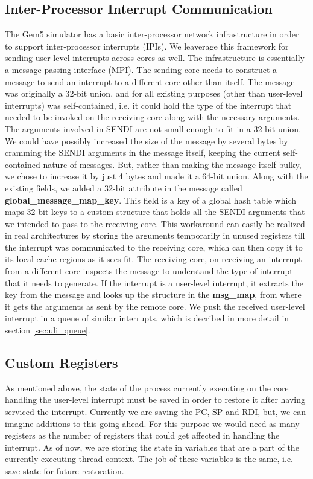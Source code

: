 \subsection{Inter-Processor Interrupt Communication}\label{sec:network}
The Gem5 simulator has a basic inter-processor network infrastructure in order
to support inter-processor interrupts (IPIs). We leaverage this framework for
sending user-level interrupts across cores as well. The infrastructure is
essentially a message-passing interface (MPI). The sending core needs to
construct a message to send an interrupt to a different core other than itself.
The message was originally a 32-bit union, and for all existing purposes (other
than user-level interrupts) was self-contained, i.e. it could hold the type of
the interrupt that needed to be invoked on the receiving core along with the
necessary arguments. The arguments involved in SENDI are not small enough to fit
in a 32-bit union. We could have possibly increased the size of the message by
several bytes by cramming the SENDI arguments in the message itself, keeping the
current self-contained nature of messages. But, rather than making the message
itself bulky, we chose to increase it by just 4 bytes and made it a 64-bit
union. Along with the existing fields, we added a 32-bit attribute in the
message called \textbf{global\_message\_map\_key}. This field is a key of a
global hash table which maps 32-bit keys to a custom structure that holds all
the SENDI arguments that we intended to pass to the receiving core. This
workaround can easily be realized in real architectures by storing the arguments
temporarily in unused registers till the interrupt was communicated to the
receiving core, which can then copy it to its local cache regions as it sees
fit. The receiving core, on receiving an interrupt from a different core
inspects the message to understand the type of interrupt that it needs to
generate. If the interrupt is a user-level interrupt, it extracts the key from
the message and looks up the structure in the \textbf{msg\_map}, from where it
gets the arguments as sent by the remote core. We push the received user-level
interrupt in a queue of similar interrupts, which is decribed in more detail in
section \ref{sec:uli_queue}.

\subsection{Custom Registers}\label{sec:regs}
As mentioned above, the state of the process currently executing on the core
handling the user-level interrupt must be saved in order to restore it after
having serviced the interrupt. Currently we are saving the PC, SP and RDI, but,
we can imagine additions to this going ahead. For this purpose we would need as
many registers as the number of registers that could get affected in handling
the interrupt. As of now, we are storing the state in variables that are a part
of the currently executing thread context. The job of these variables is the
same, i.e. save state for future restoration.

